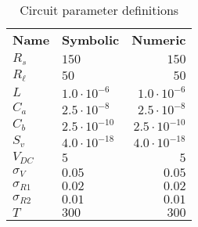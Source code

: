 \begin{table}[H]
\centering
\begin{tabular}[c]{llr}
\textbf{Name} & \textbf{Symbolic} & \textbf{Numeric} \\ 
\rowcolor{myyellow}
$R_{s}$ &$150$ &$150$ \\ 
$R_{\ell}$ &$50$ &$50$ \\ 
\rowcolor{myyellow}
$L$ &$1.0 \cdot 10^{-6}$ &$1.0 \cdot 10^{-6}$ \\ 
$C_{a}$ &$2.5 \cdot 10^{-8}$ &$2.5 \cdot 10^{-8}$ \\ 
\rowcolor{myyellow}
$C_{b}$ &$2.5 \cdot 10^{-10}$ &$2.5 \cdot 10^{-10}$ \\ 
$S_{v}$ &$4.0 \cdot 10^{-18}$ &$4.0 \cdot 10^{-18}$ \\ 
\rowcolor{myyellow}
$V_{DC}$ &$5$ &$5$ \\ 
$\sigma_{V}$ &$0.05$ &$0.05$ \\ 
\rowcolor{myyellow}
$\sigma_{R1}$ &$0.02$ &$0.02$ \\ 
$\sigma_{R2}$ &$0.01$ &$0.01$ \\ 
\rowcolor{myyellow}
$T$ &$300$ &$300$ \\ 
\end{tabular}
\caption{Circuit parameter definitions}
\label{tab-pardefs}
\end{table}

